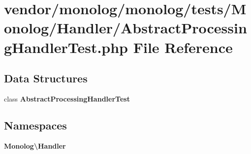 \section{vendor/monolog/monolog/tests/\+Monolog/\+Handler/\+Abstract\+Processing\+Handler\+Test.php File Reference}
\label{_abstract_processing_handler_test_8php}
\subsection*{Data Structures}
\begin{DoxyCompactItemize}
\item 
class {\bf Abstract\+Processing\+Handler\+Test}
\end{DoxyCompactItemize}
\subsection*{Namespaces}
\begin{DoxyCompactItemize}
\item 
 {\bf Monolog\textbackslash{}\+Handler}
\end{DoxyCompactItemize}
